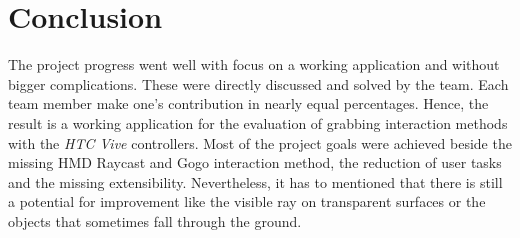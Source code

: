 \section{Conclusion} \label{sec:Conclusion}

The project progress went well with focus on a working application and without bigger complications. These were directly discussed and solved by the team. Each team member make one's contribution in nearly equal percentages. Hence, the result is a working application for the evaluation of grabbing interaction methods with the \textit{HTC Vive} controllers. Most of the project goals were achieved beside the missing HMD Raycast and Gogo interaction method, the reduction of user tasks and the missing extensibility. Nevertheless, it has to mentioned that there is still a potential for improvement like the visible ray on transparent surfaces or the objects that sometimes fall through the ground. 

\newpage

























